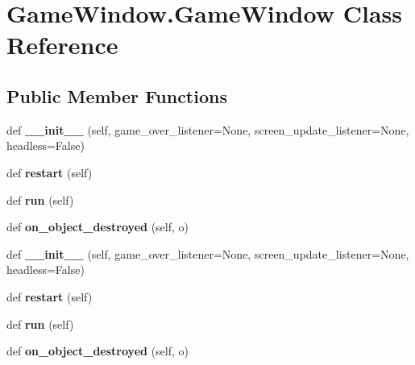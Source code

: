 \hypertarget{classGameWindow_1_1GameWindow}{}\section{Game\+Window.\+Game\+Window Class Reference}
\label{classGameWindow_1_1GameWindow}
\subsection*{Public Member Functions}
\begin{DoxyCompactItemize}
\item 
def {\bfseries \+\_\+\+\_\+init\+\_\+\+\_\+} (self, game\+\_\+over\+\_\+listener=None, screen\+\_\+update\+\_\+listener=None, headless=False)\hypertarget{classGameWindow_1_1GameWindow_a02010cc4371544b655369e6fd5794d71}{}\label{classGameWindow_1_1GameWindow_a02010cc4371544b655369e6fd5794d71}

\item 
def {\bfseries restart} (self)\hypertarget{classGameWindow_1_1GameWindow_a39325b3e2eb66949d2dd15e495fa6642}{}\label{classGameWindow_1_1GameWindow_a39325b3e2eb66949d2dd15e495fa6642}

\item 
def {\bfseries run} (self)\hypertarget{classGameWindow_1_1GameWindow_a87dc06fb2818940a4cf0d6318719e048}{}\label{classGameWindow_1_1GameWindow_a87dc06fb2818940a4cf0d6318719e048}

\item 
def {\bfseries on\+\_\+object\+\_\+destroyed} (self, o)\hypertarget{classGameWindow_1_1GameWindow_abf3b77ea8ac501d676eb86846da66835}{}\label{classGameWindow_1_1GameWindow_abf3b77ea8ac501d676eb86846da66835}

\item 
def {\bfseries \+\_\+\+\_\+init\+\_\+\+\_\+} (self, game\+\_\+over\+\_\+listener=None, screen\+\_\+update\+\_\+listener=None, headless=False)\hypertarget{classGameWindow_1_1GameWindow_a02010cc4371544b655369e6fd5794d71}{}\label{classGameWindow_1_1GameWindow_a02010cc4371544b655369e6fd5794d71}

\item 
def {\bfseries restart} (self)\hypertarget{classGameWindow_1_1GameWindow_a39325b3e2eb66949d2dd15e495fa6642}{}\label{classGameWindow_1_1GameWindow_a39325b3e2eb66949d2dd15e495fa6642}

\item 
def {\bfseries run} (self)\hypertarget{classGameWindow_1_1GameWindow_a87dc06fb2818940a4cf0d6318719e048}{}\label{classGameWindow_1_1GameWindow_a87dc06fb2818940a4cf0d6318719e048}

\item 
def {\bfseries on\+\_\+object\+\_\+destroyed} (self, o)\hypertarget{classGameWindow_1_1GameWindow_abf3b77ea8ac501d676eb86846da66835}{}\label{classGameWindow_1_1GameWindow_abf3b77ea8ac501d676eb86846da66835}

\end{DoxyCompactItemize}
